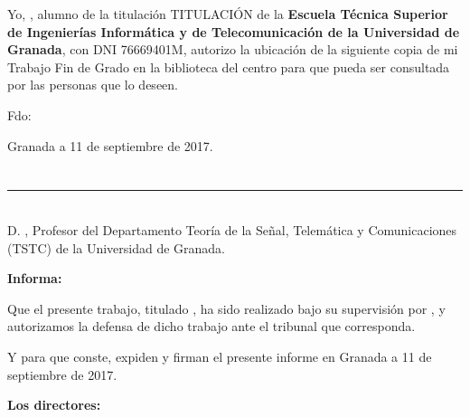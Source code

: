 Yo, \textbf{\myName}, alumno de la titulación TITULACIÓN de la \textbf{Escuela Técnica Superior
de Ingenierías Informática y de Telecomunicación de la Universidad de Granada}, con DNI 76669401M, autorizo la
ubicación de la siguiente copia de mi Trabajo Fin de Grado en la biblioteca del centro para que pueda ser
consultada por las personas que lo deseen.

\vspace{6cm}

\noindent Fdo: \myName

\vspace{2cm}

\begin{flushright}
Granada a 11 de septiembre de 2017.
\end{flushright}


\chapter*{}
\thispagestyle{empty}

\noindent\rule[-1ex]{\textwidth}{2pt}\\[4.5ex]

D. \textbf{\myProf}, Profesor del Departamento Teoría de la Señal, Telemática y Comunicaciones (TSTC) de la Universidad de Granada.

\vspace{0.5cm}




\textbf{Informa:}

\vspace{0.5cm}

Que el presente trabajo, titulado \textit{\textbf{\myTitle}},
ha sido realizado bajo su supervisión por \textbf{\myName}, y autorizamos la defensa de dicho trabajo ante el tribunal
que corresponda.

\vspace{0.5cm}

Y para que conste, expiden y firman el presente informe en Granada a 11 de septiembre de 2017.

\vspace{1cm}

\textbf{Los directores:}

\vspace{5cm}

